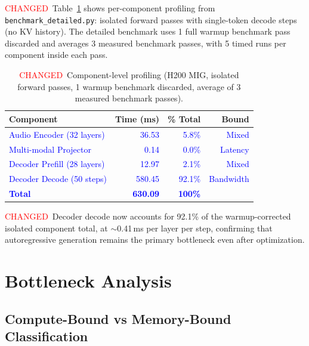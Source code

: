 \documentclass{article}
\newcommand{\chg}[1]{{\color{blue}#1}}
\newcommand{\chgcell}[1]{\textcolor{blue}{#1}}
\newcommand{\chglabel}{{\setlength{\fboxsep}{1pt}\colorbox{yellow!45}{\textcolor{red}{\scriptsize CHANGED}}}}
\begin{document}
\chglabel\ \chg{Table~\ref{tab:detailed} shows per-component profiling from \texttt{benchmark\_detailed.py}: isolated forward passes with single-token decode steps (no KV history).  The detailed benchmark uses 1 full warmup benchmark pass discarded and averages 3 measured benchmark passes, with 5 timed runs per component inside each pass.}

\begin{table}[h]
\centering
\caption{\chglabel\ \chg{Component-level profiling (H200 MIG, isolated forward passes, 1 warmup benchmark discarded, average of 3 measured benchmark passes).}}
\label{tab:detailed}
\small
\begin{tabular}{@{}lrrr@{}}
\toprule
\textbf{Component} & \textbf{Time (ms)} & \textbf{\% Total} & \textbf{Bound} \\
\midrule
\chgcell{Audio Encoder (32 layers)} & \chgcell{36.53} & \chgcell{5.8\%} & \chgcell{Mixed} \\
\chgcell{Multi-modal Projector} & \chgcell{0.14} & \chgcell{0.0\%} & \chgcell{Latency} \\
\chgcell{Decoder Prefill (28 layers)} & \chgcell{12.97} & \chgcell{2.1\%} & \chgcell{Mixed} \\
\chgcell{Decoder Decode (50 steps)} & \chgcell{580.45} & \chgcell{92.1\%} & \chgcell{Bandwidth} \\
\midrule
\chgcell{\textbf{Total}} & \chgcell{\textbf{630.09}} & \chgcell{\textbf{100\%}} & \\
\bottomrule
\end{tabular}
\end{table}

\chglabel\ \chg{Decoder decode now accounts for 92.1\% of the warmup-corrected isolated component total, at $\sim$0.41\,ms per layer per step, confirming that autoregressive generation remains the primary bottleneck even after optimization.}

\section{Bottleneck Analysis}\label{sec:bottleneck}

\subsection{Compute-Bound vs Memory-Bound Classification}
\end{document}
